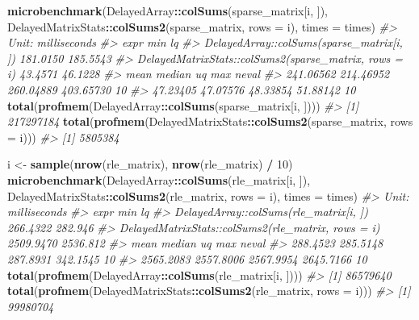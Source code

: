 \documentclass[]{book}
\newenvironment{Shaded}{\begin{snugshade}}{\end{snugshade}}
\newcommand{\KeywordTok}[1]{\textcolor[rgb]{0.13,0.29,0.53}{\textbf{#1}}}
\newcommand{\DataTypeTok}[1]{\textcolor[rgb]{0.13,0.29,0.53}{#1}}
\newcommand{\DecValTok}[1]{\textcolor[rgb]{0.00,0.00,0.81}{#1}}
\newcommand{\StringTok}[1]{\textcolor[rgb]{0.31,0.60,0.02}{#1}}
\newcommand{\CommentTok}[1]{\textcolor[rgb]{0.56,0.35,0.01}{\textit{#1}}}
\newcommand{\OperatorTok}[1]{\textcolor[rgb]{0.81,0.36,0.00}{\textbf{#1}}}
\newcommand{\NormalTok}[1]{#1}
\begin{document}
\begin{Shaded}
\begin{Highlighting}[]
\KeywordTok{microbenchmark}\NormalTok{(DelayedArray}\OperatorTok{::}\KeywordTok{colSums}\NormalTok{(sparse_matrix[i, ]),}
\NormalTok{               DelayedMatrixStats}\OperatorTok{::}\KeywordTok{colSums2}\NormalTok{(sparse_matrix, }\DataTypeTok{rows =}\NormalTok{ i),}
               \DataTypeTok{times =}\NormalTok{ times)}
\CommentTok{#> Unit: milliseconds}
\CommentTok{#>                                                   expr      min       lq}
\CommentTok{#>              DelayedArray::colSums(sparse_matrix[i, ]) 181.0150 185.5543}
\CommentTok{#>  DelayedMatrixStats::colSums2(sparse_matrix, rows = i)  43.4571  46.1228}
\CommentTok{#>       mean    median        uq       max neval}
\CommentTok{#>  241.06562 214.46952 260.04889 403.65730    10}
\CommentTok{#>   47.23405  47.07576  48.33854  51.88142    10}
\KeywordTok{total}\NormalTok{(}\KeywordTok{profmem}\NormalTok{(DelayedArray}\OperatorTok{::}\KeywordTok{colSums}\NormalTok{(sparse_matrix[i, ])))}
\CommentTok{#> [1] 217297184}
\KeywordTok{total}\NormalTok{(}\KeywordTok{profmem}\NormalTok{(DelayedMatrixStats}\OperatorTok{::}\KeywordTok{colSums2}\NormalTok{(sparse_matrix, }\DataTypeTok{rows =}\NormalTok{ i)))}
\CommentTok{#> [1] 5805384}

\NormalTok{i <-}\StringTok{ }\KeywordTok{sample}\NormalTok{(}\KeywordTok{nrow}\NormalTok{(rle_matrix), }\KeywordTok{nrow}\NormalTok{(rle_matrix) }\OperatorTok{/}\StringTok{ }\DecValTok{10}\NormalTok{)}
\KeywordTok{microbenchmark}\NormalTok{(DelayedArray}\OperatorTok{::}\KeywordTok{colSums}\NormalTok{(rle_matrix[i, ]),}
\NormalTok{               DelayedMatrixStats}\OperatorTok{::}\KeywordTok{colSums2}\NormalTok{(rle_matrix, }\DataTypeTok{rows =}\NormalTok{ i),}
               \DataTypeTok{times =}\NormalTok{ times)}
\CommentTok{#> Unit: milliseconds}
\CommentTok{#>                                                expr       min       lq}
\CommentTok{#>              DelayedArray::colSums(rle_matrix[i, ])  266.4322  282.946}
\CommentTok{#>  DelayedMatrixStats::colSums2(rle_matrix, rows = i) 2509.9470 2536.812}
\CommentTok{#>       mean    median        uq       max neval}
\CommentTok{#>   288.4523  285.5148  287.8931  342.1545    10}
\CommentTok{#>  2565.2083 2557.8006 2567.9954 2645.7166    10}
\KeywordTok{total}\NormalTok{(}\KeywordTok{profmem}\NormalTok{(DelayedArray}\OperatorTok{::}\KeywordTok{colSums}\NormalTok{(rle_matrix[i, ])))}
\CommentTok{#> [1] 86579640}
\KeywordTok{total}\NormalTok{(}\KeywordTok{profmem}\NormalTok{(DelayedMatrixStats}\OperatorTok{::}\KeywordTok{colSums2}\NormalTok{(rle_matrix, }\DataTypeTok{rows =}\NormalTok{ i)))}
\CommentTok{#> [1] 99980704}
\end{Highlighting}
\end{Shaded}
\end{document}
